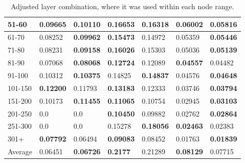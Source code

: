 \begin{table*}[h!]
\begin{tabular}{|l|l|l||l|l||l|l|}
        51-60     & 0.09665                                 & \textbf{0.10110}               & \textbf{0.16653}                 & 0.16318           & 0.06002          & \textbf{0.05816}  \\ \hline
        61-70     & 0.08252                                 & \textbf{0.09962}               & \textbf{0.15473}                 & 0.14972           & 0.05359          & \textbf{0.05446}  \\ \hline
        71-80     & 0.08231                                 & \textbf{0.09158}               & \textbf{0.16026}                 & 0.15303           & 0.05036          & \textbf{0.05139}  \\ \hline
        81-90     & 0.07068                                 & \textbf{0.08068}               & \textbf{0.12724}                 & 0.12089           & \textbf{0.04557} & 0.04482           \\ \hline
        91-100    & 0.10312                                 & \textbf{0.10375}               & 0.14825                          & \textbf{0.14837}  & 0.04576          & \textbf{0.04648}  \\ \hline
        101-150   & \textbf{0.12200}                        & 0.11793                        & \textbf{0.13183}                 & 0.12333           & 0.03746          & \textbf{0.03794}  \\ \hline
        151-200   & 0.10173                                 & \textbf{0.11455}               & \textbf{0.11065}                 & 0.10754           & 0.02945          & \textbf{0.03103}  \\ \hline
        201-250   & 0.0                                     & 0.0                            & \textbf{0.10450}                 & 0.09882           & 0.02762          & \textbf{0.02864}  \\ \hline
        251-300   & 0.0                                     & 0.0                            & 0.15278                          & \textbf{0.18056}  & \textbf{0.02463} & 0.02383           \\ \hline
        301+      & \textbf{0.07792}                        & 0.06494                        & \textbf{0.09083}                 & 0.08452           & 0.01763          & \textbf{0.01839}  \\ \hline
        Average   & 0.06451                                 & \textbf{0.06726}               & \textbf{0.2177 }                 & 0.21289           & \textbf{0.08129} & 0.07715           \\ \hline
    \end{tabular}
    \caption{Adjusted layer combination, where it was used within each node range.}
    \label{tab:recall-adjusted-layer-remove-0-embedding}
\end{table*}
